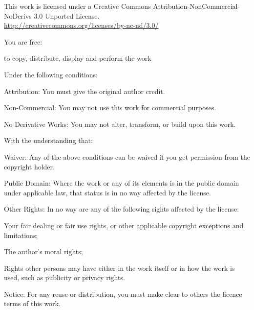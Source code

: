
{\tiny\setlength{\parindent}{0pt}%
\setlength{\parskip}{0.5\baselineskip}
\raggedright\label{copyright-details}
{\centering

{\large\ccbyncnd}
\bigskip

This work is licensed under a Creative Commons Attribution-NonCommercial-NoDerivs 3.0 Unported License.\\
\href{http://creativecommons.org/licenses/by-nc-nd/3.0/}{http://creativecommons.org/licenses/by-nc-nd/3.0/}

}


You are free:
\vspace*{-1.5\baselineskip}

\begin{packeditemize}
\item to copy, distribute, display and perform the work
\end{packeditemize}

Under the following conditions:
\vspace*{-1.5\baselineskip}

\begin{packeditemize}
\item Attribution: You must give the original author credit.
\item Non-Commercial: You may not use this work for commercial purposes.
\item No Derivative Works: You may not alter, transform, or build upon this work.
\end{packeditemize}

With the understanding that:
\vspace*{-1.5\baselineskip}

\begin{packeditemize}
\item Waiver: Any of the above conditions can be waived if you get permission from the copyright holder.
\item Public Domain: Where the work or any of its elements is in the public domain under applicable law, that status is in no way affected by the license.
\item Other Rights: In no way are any of the following rights affected by the license:
\begin{packeditemize}
\item Your fair dealing or fair use rights, or other applicable copyright exceptions and limitations;
\item The author's moral rights;
\item Rights other persons may have either in the work itself or in how the work is used, such as publicity or privacy rights.
\end{packeditemize}
\item Notice: For any reuse or distribution, you must make clear to others the licence terms of this work.
\end{packeditemize}

}
